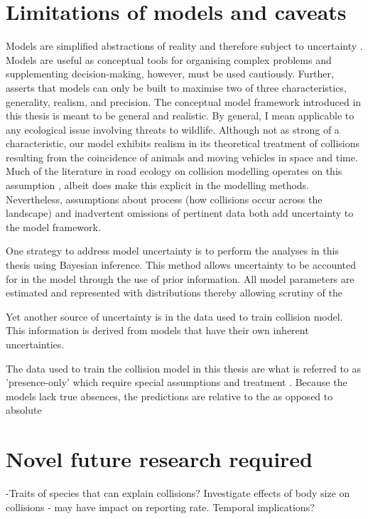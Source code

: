 \section{Limitations of models and caveats}

Models are simplified abstractions of reality and therefore subject to uncertainty \citep{burg05}. Models are useful as conceptual tools for organising complex problems and supplementing decision-making, however, must be used cautiously. Further, \cite{levi66} asserts that models can only be built to maximise two of three characteristics, generality, realism, and precision. The conceptual model framework introduced in this thesis is meant to be general and realistic. By general, I mean applicable to any ecological issue involving threats to wildlife. Although not as strong of a characteristic, our model exhibits realism in its theoretical treatment of collisions resulting from the coincidence of animals and moving vehicles in space and time. Much of the literature in road ecology on collision modelling operates on this assumption \citep{}, albeit does make this explicit in the modelling methods. Nevertheless, assumptions about process (how collisions occur across the landscape) and inadvertent omissions of pertinent data both add uncertainty to the model framework.

One strategy to address model uncertainty is to perform the analyses in this thesis using Bayesian inference. This method allows uncertainty to be accounted for in the model through the use of prior information. All model parameters are estimated and represented with distributions thereby allowing scrutiny of the 

Yet another source of uncertainty is in the data used to train collision model. This information is derived from models that have their own inherent uncertainties.   

The data used to train the collision model in this thesis are what is referred to as 'presence-only' which require special assumptions and treatment \citep{}. Because the models lack true absences, the predictions are relative to the as opposed to absolute

\section{Novel future research required}

-Traits of species that can explain collisions? Investigate effects of body size on collisions - may have impact on reporting rate. Temporal implications?


